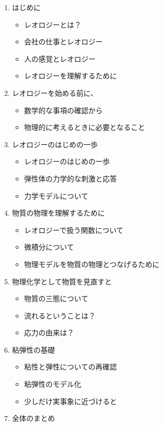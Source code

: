 \documentclass[uplatex,a4paper,11pt]{jsarticle}
\begin{document}
\begin{enumerate}
    \item はじめに
    \begin{itemize}
        \item レオロジーとは？
        \item 会社の仕事とレオロジー
        \item 人の感覚とレオロジー
        \item レオロジーを理解するために
    \end{itemize}
    \item レオロジーを始める前に、
    \begin{itemize}
        \item 数学的な事項の確認から
        \item 物理的に考えるときに必要となること
    \end{itemize}
    \item レオロジーのはじめの一歩
    \begin{itemize}
        \item レオロジーのはじめの一歩
        \item 弾性体の力学的な刺激と応答
        \item 力学モデルについて
    \end{itemize}
    \item 物質の物理を理解するために
    \begin{itemize}
        \item レオロジーで扱う関数について
        \item 微積分について
        \item 物理モデルを物質の物理とつなげるために
    \end{itemize}
    \item 物理化学として物質を見直すと
    \begin{itemize}
        \item 物質の三態について
        \item 流れるということは？
        \item 応力の由来は？
    \end{itemize}
    \item 粘弾性の基礎
    \begin{itemize}
        \item 粘性と弾性についての再確認
        \item 粘弾性のモデル化
        \item 少しだけ実事象に近づけると
    \end{itemize}
    \item 全体のまとめ
\end{enumerate}
\end{document}
